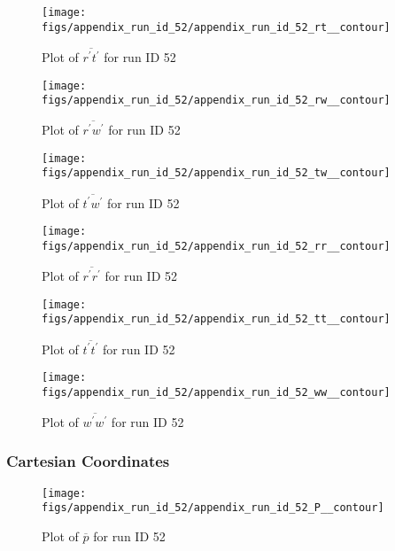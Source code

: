 \begin{figure}[H]
\centering
\texttt{[image: figs/appendix\_run\_id\_52/appendix\_run\_id\_52\_rt\_\_contour]}
\caption{Plot of $\overline{r^\prime t^\prime}$ for run ID 52}
\label{fig:appendix_run_id_52_rt__contour}
\end{figure}


\begin{figure}[H]
\centering
\texttt{[image: figs/appendix\_run\_id\_52/appendix\_run\_id\_52\_rw\_\_contour]}
\caption{Plot of $\overline{r^\prime w^\prime}$ for run ID 52}
\label{fig:appendix_run_id_52_rw__contour}
\end{figure}


\begin{figure}[H]
\centering
\texttt{[image: figs/appendix\_run\_id\_52/appendix\_run\_id\_52\_tw\_\_contour]}
\caption{Plot of $\overline{t^\prime w^\prime}$ for run ID 52}
\label{fig:appendix_run_id_52_tw__contour}
\end{figure}


\begin{figure}[H]
\centering
\texttt{[image: figs/appendix\_run\_id\_52/appendix\_run\_id\_52\_rr\_\_contour]}
\caption{Plot of $\overline{r^\prime r^\prime}$ for run ID 52}
\label{fig:appendix_run_id_52_rr__contour}
\end{figure}


\begin{figure}[H]
\centering
\texttt{[image: figs/appendix\_run\_id\_52/appendix\_run\_id\_52\_tt\_\_contour]}
\caption{Plot of $\overline{t^\prime t^\prime}$ for run ID 52}
\label{fig:appendix_run_id_52_tt__contour}
\end{figure}


\begin{figure}[H]
\centering
\texttt{[image: figs/appendix\_run\_id\_52/appendix\_run\_id\_52\_ww\_\_contour]}
\caption{Plot of $\overline{w^\prime w^\prime}$ for run ID 52}
\label{fig:appendix_run_id_52_ww__contour}
\end{figure}


\subsubsection{Cartesian Coordinates}
\begin{figure}[H]
\centering
\texttt{[image: figs/appendix\_run\_id\_52/appendix\_run\_id\_52\_P\_\_contour]}
\caption{Plot of $\overline{p}$ for run ID 52}
\label{fig:appendix_run_id_52_P__contour}
\end{figure}


